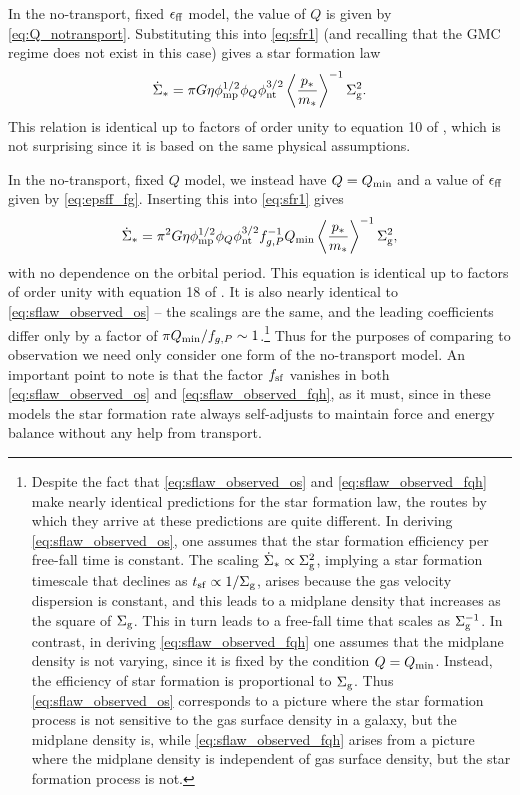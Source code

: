 \documentclass[useAMS,usenatbib]{mn2e}
\newcommand{\phint}{\phi_{\mathrm{nt}}}
\newcommand{\phimp}{\phi_{\mathrm{mp}}}
\newcommand{\Qmin}{Q_{\rm min}}
\begin{document}
In the no-transport, fixed $\epsilon_{\rm ff}$ model, the value of $Q$ is given by \autoref{eq:Q_notransport}. Substituting this into \autoref{eq:sfr1} (and recalling that the GMC regime does not exist in this case) gives a star formation law
\begin{equation}
\label{eq:sflaw_observed_os}
\dot{\Sigma}_* = \pi G \eta \phimp^{1/2} \phi_Q \phint^{3/2} \left\langle\frac{p_*}{m_*}\right\rangle^{-1} \Sigma_{\rm g}^2.
\end{equation}
This relation is identical up to factors of order unity to equation 10 of \citet{ostriker11a}, which is not surprising since it is based on the same physical assumptions. 

In the no-transport, fixed $Q$ model, we instead have $Q=\Qmin$ and a value of $\epsilon_{\rm ff}$ given by \autoref{eq:epsff_fg}. Inserting this into \autoref{eq:sfr1} gives
\begin{equation}
\label{eq:sflaw_observed_fqh}
\dot{\Sigma}_* = \pi^2 G \eta \phimp^{1/2} \phi_Q \phint^{3/2} f_{g,P}^{-1} \Qmin \left\langle\frac{p_*}{m_*}\right\rangle^{-1} \Sigma_{\rm g}^2,
\end{equation}
with no dependence on the orbital period. This equation is identical up to factors of order unity with equation 18 of \citet{faucher-giguere13a}. It is also nearly identical to \autoref{eq:sflaw_observed_os} -- the scalings are the same, and the leading coefficients differ only by a factor of $\pi \Qmin/f_{g,P} \sim 1$.\footnote{Despite the fact that \autoref{eq:sflaw_observed_os} and \autoref{eq:sflaw_observed_fqh} make nearly identical predictions for the star formation law, the routes by which they arrive at these predictions are quite different. In deriving \autoref{eq:sflaw_observed_os}, one assumes that the star formation efficiency per free-fall time is constant. The scaling $\dot{\Sigma}_* \propto \Sigma_{\rm g}^2$, implying a star formation timescale that declines as $t_{\rm sf}\propto 1/\Sigma_{\rm g}$, arises because the gas velocity dispersion is constant, and this leads to a midplane density that increases as the square of $\Sigma_{\rm g}$. This in turn leads to a free-fall time that scales as $\Sigma_{\rm g}^{-1}$. In contrast, in deriving \autoref{eq:sflaw_observed_fqh} one assumes that the midplane density is not varying, since it is fixed by the condition $Q=\Qmin$. Instead, the efficiency of star formation is proportional to $\Sigma_{\rm g}$. Thus \autoref{eq:sflaw_observed_os} corresponds to a picture where the star formation process is not sensitive to the gas surface density in a galaxy, but the midplane density is, while \autoref{eq:sflaw_observed_fqh} arises from a picture where the midplane density is independent of gas surface density, but the star formation process is not.} Thus for the purposes of comparing to observation we need only consider one form of the no-transport model. An important point to note is that the factor $f_{\rm sf}$ vanishes in both \autoref{eq:sflaw_observed_os} and \autoref{eq:sflaw_observed_fqh}, as it must, since in these models the star formation rate always self-adjusts to maintain force and energy balance without any help from transport. 
\end{document}
